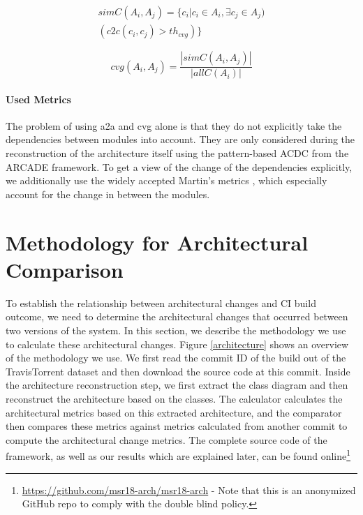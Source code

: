 \documentclass[sigconf, anonymous, review]{acmart}
\begin{document}
\begin{equation} \label{eq:simC}
\begin{split}
simC(A_i, A_j) = \{c_i | c_i \in A_i, \exists c_j \in A_j) \\ 
(c2c(c_i, c_j) > th_{cvg})\}
\end{split}
\end{equation}

\begin{equation} \label{eq:cvg}
cvg(A_i, A_j) = \frac{|simC(A_i, A_j)|}{|allC(A_i)|}
\end{equation}

\paragraph{Used Metrics} 
The problem of using a2a and cvg alone is that they do not explicitly take the dependencies between modules into account. 
They are only considered during the reconstruction of the architecture itself using the pattern-based ACDC from the ARCADE framework.
To get a view of the change of the dependencies explicitly, we additionally use the widely accepted Martin's metrics \cite{Val-MartinsMet}, which especially account for the change in between the modules. 

\section{Methodology for Architectural Comparison}

To establish the relationship between architectural changes and CI build outcome, we need to determine the architectural changes that occurred between two versions of the system.
In this section, we describe the methodology we use to calculate these architectural changes.
Figure \ref{architecture} shows an overview of the methodology we use.
We first read the commit ID of the build out of the TravisTorrent dataset and then download the source code at this commit. Inside the architecture reconstruction step, we first extract the class diagram and then reconstruct the architecture based on the classes. 
The calculator calculates the architectural metrics based on this extracted architecture, and the comparator then compares these metrics against metrics calculated from another commit to compute the architectural change metrics. 
The complete source code of the framework, as well as our results which are explained later, can be found online\footnote{\url{https://github.com/msr18-arch/msr18-arch} - Note that this is an anonymized GitHub repo to comply with the double blind policy.}
 
\end{document}
